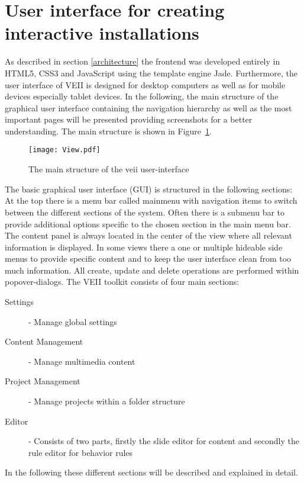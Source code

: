 \section{User interface for creating interactive installations}
As described in section \ref{architecture} the frontend was developed entirely in HTML5, CSS3 and JavaScript using the template engine Jade. Furthermore, the user interface of VEII is designed for desktop computers as well as for mobile devices especially tablet devices. In the following, the main structure of the graphical user interface containing the navigation hierarchy as well as the most important pages will be presented providing screenshots for a better understanding.
The main structure is shown in Figure~\ref{fig:view}. 
\begin{figure}
  \begin{center}
    \texttt{[image: View.pdf]}
    \caption{The main structure of the veii user-interface}
    \label{fig:view}
  \end{center}
\end{figure}
The basic graphical user interface (GUI) is structured in the following sections: At the top there is a menu bar called mainmenu with navigation items to switch between the different sections of the system. Often there is a submenu bar to provide additional options specific to the chosen section in the main menu bar. The content panel is always located in the center of the view where all relevant information is displayed. In some views there a one or multiple hideable side menus to provide specific content and to keep the user interface clean from too much information. All create, update and delete operations are performed within popover-dialogs. The VEII toolkit consists of four main sections: 

\begin{description}
\item [Settings] - Manage global settings
\item [Content Management] - Manage multimedia content
\item [Project Management] - Manage projects within a folder structure
\item [Editor] - Consists of two parts, firstly the slide editor for content and secondly the rule editor for behavior rules
\end{description}

In the following these different sections will be described and explained in detail.

